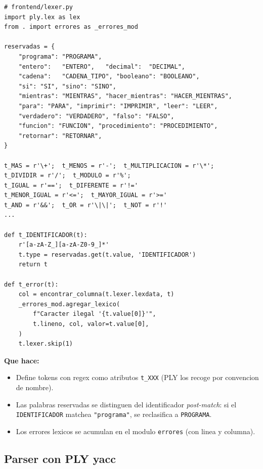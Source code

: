 \documentclass[11pt,a4paper]{article}
\begin{document}
\begin{lstlisting}[style=py]
# frontend/lexer.py
import ply.lex as lex
from . import errores as _errores_mod

reservadas = {
    "programa": "PROGRAMA",
    "entero":   "ENTERO",   "decimal":  "DECIMAL",
    "cadena":   "CADENA_TIPO", "booleano": "BOOLEANO",
    "si": "SI", "sino": "SINO",
    "mientras": "MIENTRAS", "hacer_mientras": "HACER_MIENTRAS",
    "para": "PARA", "imprimir": "IMPRIMIR", "leer": "LEER",
    "verdadero": "VERDADERO", "falso": "FALSO",
    "funcion": "FUNCION", "procedimiento": "PROCEDIMIENTO",
    "retornar": "RETORNAR",
}

t_MAS = r'\+';  t_MENOS = r'-';  t_MULTIPLICACION = r'\*';
t_DIVIDIR = r'/';  t_MODULO = r'%';
t_IGUAL = r'==';  t_DIFERENTE = r'!='
t_MENOR_IGUAL = r'<=';  t_MAYOR_IGUAL = r'>='
t_AND = r'&&';  t_OR = r'\|\|';  t_NOT = r'!'
...

def t_IDENTIFICADOR(t):
    r'[a-zA-Z_][a-zA-Z0-9_]*'
    t.type = reservadas.get(t.value, 'IDENTIFICADOR')
    return t

def t_error(t):
    col = encontrar_columna(t.lexer.lexdata, t)
    _errores_mod.agregar_lexico(
        f"Caracter ilegal '{t.value[0]}'",
        t.lineno, col, valor=t.value[0],
    )
    t.lexer.skip(1)
\end{lstlisting}

\textbf{Que hace:}
\begin{itemize}[leftmargin=*,nosep]
  \item Define tokens con regex como atributos \texttt{t\_XXX} (PLY los
        recoge por convencion de nombre).
  \item Las palabras reservadas se distinguen del identificador
        \emph{post-match}: si el \texttt{IDENTIFICADOR} matchea
        \texttt{"programa"}, se reclasifica a \texttt{PROGRAMA}.
  \item Los errores lexicos se acumulan en el modulo \texttt{errores}
        (con linea y columna).
\end{itemize}

\subsection{Parser con PLY yacc}
\end{document}
